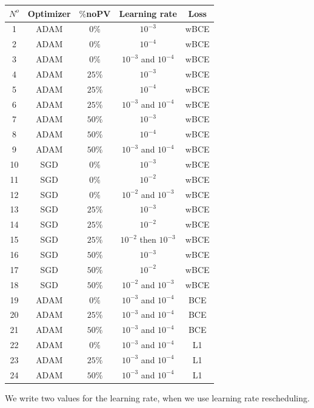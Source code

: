 \documentclass[10pt,conference]{IEEEtran}
\begin{document}
\begin{center}
    \begin{tabular}{||c | c  | c | c | c ||} 
        \hline
        $N^o$ & Optimizer & $\%$noPV & Learning rate & Loss \\ [0.5ex] 
        \hline\hline
        1 & ADAM & $0\% $ & $10^{-3}$ & wBCE \\
        \hline
        2 & ADAM & $0\% $ & $10^{-4}$ & wBCE \\
        \hline
        3 & ADAM & $0\% $ & $10^{-3}$ and $10^{-4}$ & wBCE \\
        \hline
        4 & ADAM & $25\% $ & $10^{-3}$  & wBCE \\
        \hline
        5 & ADAM & $25\% $ & $10^{-4}$ & wBCE \\
        \hline
        6 & ADAM & $25\% $ & $10^{-3}$ and $10^{-4}$ & wBCE \\
        \hline
        7 & ADAM & $50\% $ & $10^{-3}$ & wBCE \\
        \hline
        8 & ADAM & $50\% $ & $10^{-4}$ & wBCE \\
        \hline
        9 & ADAM & $50\% $ & $10^{-3}$ and $10^{-4}$ & wBCE \\
        \hline
        10 & SGD & $0\% $ & $10^{-3}$ & wBCE \\
        \hline
        11 & SGD & $0\% $ & $10^{-2}$ & wBCE \\
        \hline
        12 & SGD & $0\% $ & $10^{-2}$ and $10^{-3}$ & wBCE \\
        \hline
        13 & SGD & $25\% $ & $10^{-3}$ & wBCE \\
        \hline
        14 & SGD & $25\% $ & $10^{-2}$ & wBCE \\
        \hline
        15 & SGD & $25\% $ & $10^{-2}$ then $10^{-3}$ & wBCE \\
        \hline
        16 & SGD & $50\% $ & $10^{-3}$ & wBCE \\
        \hline
        17 & SGD & $50\% $ & $10^{-2}$ & wBCE \\
        \hline
        18 & SGD & $50\% $ & $10^{-2}$ and $10^{-3}$ & wBCE \\
        \hline
        19 & ADAM & $0\% $ & $10^{-3}$ and $10^{-4}$ & BCE \\
        \hline
        20 & ADAM & $25\% $ & $10^{-3}$ and $10^{-4}$ & BCE \\
        \hline
        21 & ADAM & $50\% $ & $10^{-3}$ and $10^{-4}$ & BCE \\
        \hline
        22 & ADAM & $0\% $ & $10^{-3}$ and $10^{-4}$ & L1 \\
        \hline
        23 & ADAM & $25\% $ & $10^{-3}$ and $10^{-4}$ & L1 \\
        \hline
        24 & ADAM & $50\% $ & $10^{-3}$ and $10^{-4}$ & L1 \\
        \hline
        
        \hline
    \end{tabular}
\end{center}
We write two values for the learning rate, when we use learning rate rescheduling. 
\end{document}
